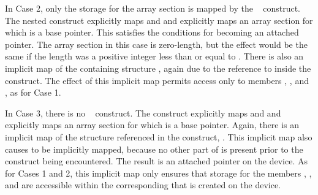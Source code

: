 In Case 2, only the storage for the array section  is mapped
by the ~ construct.  The nested 
construct explicitly maps  and  and explicitly
maps an array section for which  is a base pointer. This satisfies
the conditions for  becoming an attached pointer. The array
section in this case is zero-length, but the effect would be the same if the
length was a positive integer less than or equal to . There is also an
implicit map of the containing structure , again due to the reference
to  inside the construct. The effect of this implicit map permits
access only to members , , and , as for Case 1. 

In Case 3, there is no ~ construct. The 
construct explicitly maps  and  and explicitly
maps an array section for which  is a base pointer. Again, there is
an implicit map of the structure referenced in the construct, . This
implicit map also causes  to be implicitly mapped, because no other
part of  is present prior to the construct being encountered. The
result is an attached pointer  on the device. As for Cases 1 and 2,
this implicit map only ensures that storage for the members , ,
and  are accessible within the corresponding  that is created
on the device.


